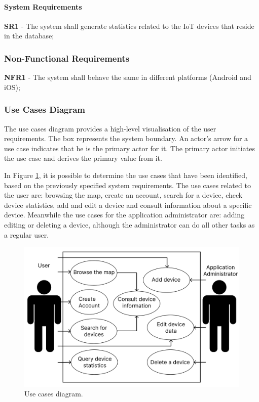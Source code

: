 \paragraph{System Requirements}

\textbf{SR1} - The system shall generate statistics related to the IoT devices that reside in the database;

\subsubsection{Non-Functional Requirements}

\textbf{NFR1} - The system shall behave the same in different platforms (Android and iOS);

\subsubsection{Use Cases Diagram}

The use cases diagram \cite{wiegers2013software} provides a high-level visualisation of the user
requirements. The box represents the system boundary. An actor's arrow
for a use case indicates that he is the primary actor for it.
The primary actor initiates the use case and derives the primary value
from it.

In Figure \ref{fig:use_cases_diagram}, it is possible to determine the use cases
that have been identified, based on the previously specified system requirements.
The use cases related to the user are: browsing the map, create an account, search for
a device, check device statistics, add and edit a device and consult information
about a specific device. Meanwhile the use cases for the application administrator are:
adding editing or deleting a device, although the administrator can do all other
tasks as a regular user.

\begin{figure}[H]
    \centering
    \includegraphics[width=15cm]{../app/docs/software_requirements/assets/images/use_cases_diagram.png}
    \caption{Use cases diagram.}
    \label{fig:use_cases_diagram}
\end{figure}

